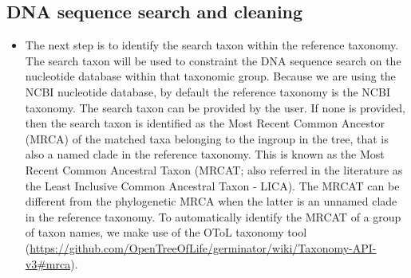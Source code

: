 \documentclass[draft]{ametsoc}
\begin{document}
\hypertarget{dna-sequence-search-and-cleaning}{%
\subsection{DNA sequence search and
cleaning}\label{dna-sequence-search-and-cleaning}}

\begin{itemize}
\item
  The next step is to identify the search taxon within the reference
  taxonomy. The search taxon will be used to constraint the DNA sequence
  search on the nucleotide database within that taxonomic group. Because
  we are using the NCBI nucleotide database, by default the reference
  taxonomy is the NCBI taxonomy. The search taxon can be provided by the
  user. If none is provided, then the search taxon is identified as the
  Most Recent Common Ancestor (MRCA) of the matched taxa belonging to
  the ingroup in the tree, that is also a named clade in the reference
  taxonomy. This is known as the Most Recent Common Ancestral Taxon
  (MRCAT; also referred in the literature as the Least Inclusive Common
  Ancestral Taxon - LICA). The MRCAT can be different from the
  phylogenetic MRCA when the latter is an unnamed clade in the reference
  taxonomy. To automatically identify the MRCAT of a group of taxon
  names, we make use of the OToL taxonomy tool
  (\url{https://github.com/OpenTreeOfLife/germinator/wiki/Taxonomy-API-v3\#mrca}).


\end{itemize}
\end{document}
